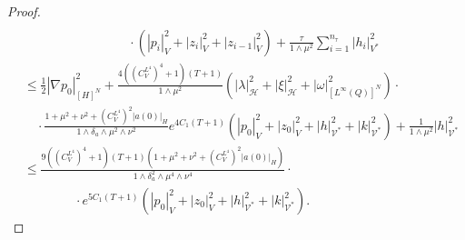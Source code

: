 \documentclass{sinst}
\numberwithin{equation}{section}
\theoremstyle{plain}
\theoremstyle{definition}
\def\sH{\mathscr{H}}
\def\sV{\mathscr{V}}
\begin{document}
\begin{proof}
\begin{align}
    \\
    &\qquad \cdot (|p_i|_V^2 + |z_i|_V^2 + |z_{i-1}|_V^2) + \frac{\tau}{1 \wedge \mu^2}\sum_{i=1}^{n_\tau} |h_i|_{V^*}^2
  \end{align}
  \begin{align}
    &\leq \frac{1}{2}|\nabla p_0|_{[H]^N}^2 + \frac{4((C_V^{L^4})^4 + 1)(T+1)}{1 \wedge \mu^2} (|\lambda|_\sH^2 + |\xi|_\sH^2 + |\omega|_{[L^\infty(Q)]^N}^2) \cdot 
    \\
    &\quad \cdot\frac{1 + \mu^2 + \nu^2 + (C_V^{L^4})^2|a(0)|_H}{1 \wedge \delta_a \wedge \mu^2 \wedge \nu^2} e^{4 C_1 (T + 1)}(|p_0|_V^2 + |z_0|_V^2 + |h|_{\sV^*}^2 + |k|_{\sV^*}^2) + \frac{1}{1 \wedge \mu^2}|h|_{\sV^*}^2
    \\
    &\leq \frac{9((C_V^{L^4})^4 + 1)(T+1)(1 + \mu^2 + \nu^2 + (C_V^{L^4})^2|a(0)|_H)}{1 \wedge \delta_a^2 \wedge \mu^4 \wedge \nu^4} \cdot
    \\
    &\qquad\qquad \cdot e^{5C_1 (T+1)}(|p_0|_V^2 + |z_0|_V^2 + |h|_{\sV^*}^2 + |k|_{\sV^*}^2).
  \end{align}
  

\end{proof}
\end{document}
